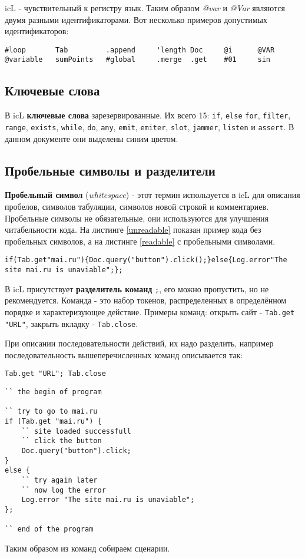 icL - чувствительный к регистру язык. Таким образом \textit{@var} и \textit{@Var} являются двумя разными идентификаторами. Вот несколько примеров допустимых идентификаторов:

\begin{lstlisting}[numbers=none]
#loop		Tab		    .append		'length	Doc	    @i	 	@VAR
@variable	sumPoints	#global		.merge	.get	#01		sin
\end{lstlisting}

\subsection{Ключевые слова}

В icL \textbf{ключевые слова} зарезервированные. Их всего 15: \lstinline|if|, \lstinline|else| \lstinline|for|, \lstinline|filter|, \lstinline|range|, \lstinline|exists|, \lstinline|while|, \lstinline|do|, \lstinline|any|, \lstinline|emit|, \lstinline|emiter|, \lstinline|slot|, \lstinline|jammer|, \lstinline|listen| и \lstinline|assert|. В данном документе они выделены синим цветом.

\subsection{Пробельные символы и разделители}

\textbf{Пробельный символ} (\textit{whitespace}) - этот термин используется в icL для описания пробелов, символов табуляции, символов новой строкой и комментариев. Пробельные символы не обязательные, они используются для улучшения читабельности кода. На листинге \ref{unreadable} показан пример кода без пробельных символов, а на листинге \ref{readable} с пробельными символами.

\begin{lstlisting}[caption=Koд без пробельных символов,label=unreadable]
if(Tab.get"mai.ru"){Doc.query("button").click();}else{Log.error"The site mai.ru is unaviable";};
\end{lstlisting}

В icL присутствует \textbf{разделитель команд} \lstinline|;|, его можно пропустить, но не рекомендуется. Команда - это набор токенов, распределенных в определённом порядке и характеризующее действие. Примеры команд: открыть сайт - \lstinline|Tab.get "URL"|, закрыть вкладку - \lstinline|Tab.close|.

При описании последовательности действий, их надо разделить, например последовательность вышеперечисленных команд описывается так:
\begin{lstlisting}[numbers=none]
Tab.get "URL"; Tab.close
\end{lstlisting}

\begin{lstlisting}[caption=Koд с пробельных символов,label=readable]
`` the begin of program

`` try to go to mai.ru
if (Tab.get "mai.ru") {
	`` site loaded successfull
	`` click the button
	Doc.query("button").click;
}
else {
	`` try again later
	`` now log the error
	Log.error "The site mai.ru is unaviable";
};

`` end of the program
\end{lstlisting}

Таким образом из команд собираем сценарии.
